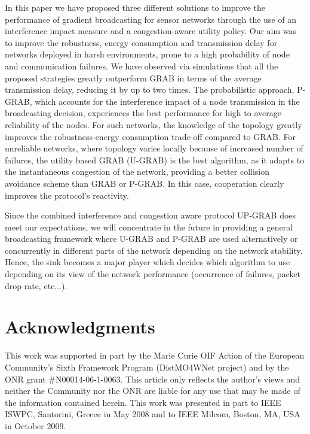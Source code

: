 \documentclass[journal, peerreview, onecolumn, draftcls]{IEEEtran}
\begin{document}
In this paper we have proposed three different solutions to improve the performance of gradient broadcasting for sensor networks through the use of an interference impact measure and a congestion-aware utility policy. Our aim was to improve the robustness, energy consumption and transmission delay for networks deployed in harsh environments, prone to a high probability of node and communication failures.
We have observed via simulations that all the proposed strategies greatly outperform GRAB in terms of the average transmission delay, reducing it by up to two times.
The probabilistic approach, P-GRAB, which accounts for the interference impact of a node transmission in the broadcasting decision, experiences the best performance for high to average reliability of the nodes. For such networks, the knowledge of the topology greatly improves the robustness-energy consumption trade-off compared to GRAB. For unreliable networks, where topology varies locally because of increased number of failures, the utility based GRAB (U-GRAB) is the best algorithm, as it adapts to the instantaneous congestion of the network, providing a better collision avoidance scheme than GRAB or P-GRAB.
In this case, cooperation clearly improves the protocol's reactivity.

Since the combined interference and congestion aware protocol UP-GRAB does meet our expectations, we will concentrate in the future in providing a general broadcasting framework where U-GRAB and P-GRAB are used alternatively or concurrently in different parts of the network depending on the network stability. Hence, the sink becomes a major player which decides which algorithm to use depending on its view of the network performance (occurrence of failures, packet drop rate, etc...).

\section*{Acknowledgments}
This work was supported in part by the Marie Curie OIF Action of the European Community's Sixth Framework Program (DistMO4WNet project) and by the ONR grant \#N00014-06-1-0063. This article only reflects the author's views and neither the Community nor the ONR are liable for any use that may be made of the information contained herein. This work was
presented in part to IEEE ISWPC, Santorini, Greece in May 2008 and to IEEE Milcom, Boston, MA, USA in October 2009.



\end{document}
